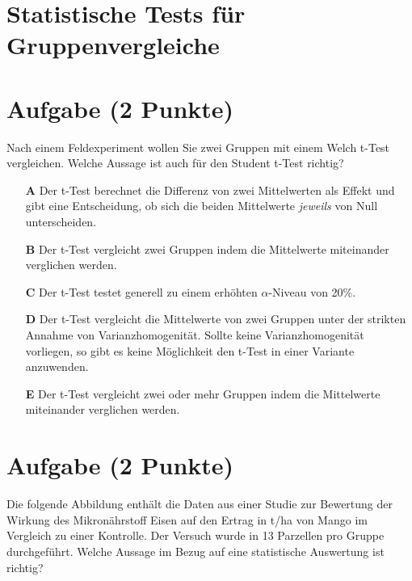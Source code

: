 \documentclass[a4paper, 9pt]{scrartcl}\usepackage[]{graphicx}\usepackage[]{xcolor}
\begin{document}
\section*{Statistische Tests für Gruppenvergleiche} 

\section{Aufgabe \hfill (2 Punkte)}



Nach einem Feldexperiment wollen Sie zwei Gruppen mit einem Welch t-Test vergleichen. Welche Aussage ist auch für den Student t-Test richtig?



\begin{enumerate}
\item [\textbf{A} \msquare] Der t-Test berechnet die Differenz von zwei Mittelwerten als Effekt und gibt eine Entscheidung, ob sich die beiden Mittelwerte \textit{jeweils} von Null unterscheiden.
\item [\textbf{B} \msquare] Der t-Test vergleicht zwei Gruppen indem die Mittelwerte miteinander verglichen werden.
\item [\textbf{C} \msquare] Der t-Test testet generell zu einem erhöhten $\alpha$-Niveau von 20\%.
\item [\textbf{D} \msquare] Der t-Test vergleicht die Mittelwerte von zwei Gruppen unter der strikten Annahme von Varianzhomogenität. Sollte keine Varianzhomogenität vorliegen, so gibt es keine Möglichkeit den t-Test in einer Variante anzuwenden.
\item [\textbf{E} \msquare] Der t-Test vergleicht zwei oder mehr Gruppen indem die Mittelwerte miteinander verglichen werden.
\end{enumerate}

\section{Aufgabe \hfill (2 Punkte)}



Die folgende Abbildung enthält die Daten aus einer Studie zur Bewertung der Wirkung des Mikronährstoff Eisen auf den Ertrag in t/ha von Mango im Vergleich zu einer Kontrolle. Der Versuch wurde in 13 Parzellen pro Gruppe durchgeführt. Welche Aussage im Bezug auf eine statistische Auswertung ist richtig?
\end{document}
